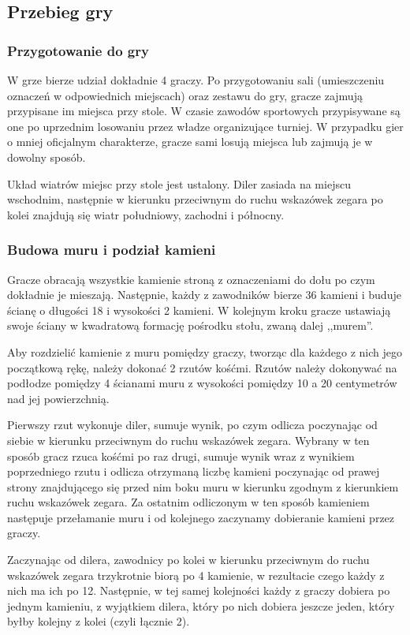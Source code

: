 \subsection{Przebieg gry}
\subsubsection{Przygotowanie do gry}
W grze bierze udział dokładnie 4 graczy. Po przygotowaniu sali (umieszczeniu
oznaczeń w odpowiednich miejscach) oraz zestawu do gry, gracze zajmują
przypisane im miejsca przy stole. W czasie zawodów sportowych przypisywane są
one po uprzednim losowaniu przez władze organizujące turniej. W przypadku gier o
mniej oficjalnym charakterze, gracze sami losują miejsca lub zajmują je w
dowolny sposób. %

Układ wiatrów miejsc przy stole jest ustalony. Diler zasiada na miejscu
wschodnim, następnie w kierunku przeciwnym do ruchu wskazówek zegara po kolei
znajdują się wiatr południowy, zachodni i północny.

\subsubsection{Budowa muru i podział kamieni}
Gracze obracają wszystkie kamienie stroną z oznaczeniami do dołu po czym
dokładnie je mieszają. Następnie, każdy z zawodników bierze 36 kamieni i buduje
ścianę o długości 18 i wysokości 2 kamieni. W kolejnym kroku gracze ustawiają
swoje ściany w kwadratową formację pośrodku stołu, zwaną dalej ,,murem''.

Aby rozdzielić kamienie z muru pomiędzy graczy, tworząc dla każdego z nich jego
początkową rękę, należy dokonać 2 rzutów kośćmi. Rzutów należy dokonywać na
podłodze pomiędzy 4 ścianami muru z wysokości pomiędzy 10 a 20 centymetrów nad
jej powierzchnią. 

Pierwszy rzut wykonuje diler, sumuje wynik, po czym odlicza poczynając od siebie
w kierunku przeciwnym do ruchu wskazówek zegara. Wybrany w ten sposób gracz
rzuca kośćmi po raz drugi, sumuje wynik wraz z wynikiem poprzedniego
rzutu i odlicza otrzymaną liczbę kamieni poczynając od prawej strony
znajdującego się przed nim boku muru w kierunku zgodnym z kierunkiem ruchu
wskazówek zegara. Za ostatnim odliczonym w ten sposób kamieniem następuje
przełamanie muru i od kolejnego zaczynamy dobieranie kamieni przez graczy.

Zaczynając od dilera, zawodnicy po kolei w kierunku przeciwnym do ruchu
wskazówek zegara trzykrotnie biorą po 4 kamienie, w rezultacie czego każdy z
nich ma ich po 12. Następnie, w tej samej kolejności każdy z graczy dobiera po
jednym kamieniu, z wyjątkiem dilera, który po nich dobiera jeszcze jeden, który
byłby kolejny z kolei (czyli łącznie 2).

